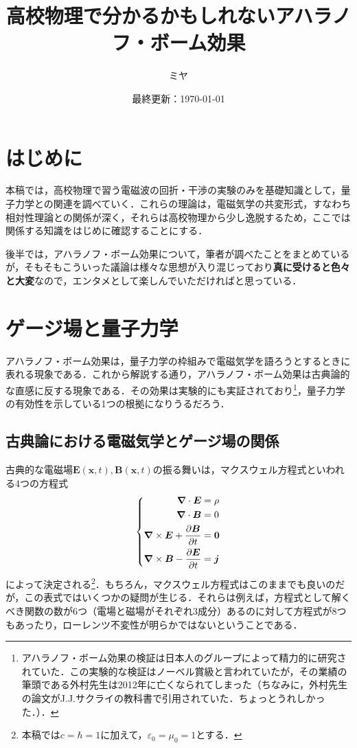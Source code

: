 \documentclass[a4paper,pdflatex,ja=standard]{bxjsarticle}
\title{高校物理で分かるかもしれないアハラノフ・ボーム効果}
\author{ミヤ}
\date{最終更新：\today}
\begin{document}
\maketitle

\tableofcontents

\clearpage
\section{はじめに}

本稿では，高校物理で習う電磁波の回折・干渉の実験のみを基礎知識として，量子力学との関連を調べていく．これらの理論は，電磁気学の共変形式，すなわち相対性理論との関係が深く，それらは高校物理から少し逸脱するため，ここでは関係する知識をはじめに確認することにする．

後半では，アハラノフ・ボーム効果について，筆者が調べたことをまとめているが，そもそもこういった議論は様々な思想が入り混じっており\textbf{真に受けると色々と大変}なので，エンタメとして楽しんでいただければと思っている．


\section{ゲージ場と量子力学}

アハラノフ・ボーム効果は，量子力学の枠組みで電磁気学を語ろうとするときに表れる現象である．これから解説する通り，アハラノフ・ボーム効果は古典論的な直感に反する現象である．その効果は実験的にも実証されており\footnote{
  アハラノフ・ボーム効果の検証は日本人のグループによって精力的に研究されていた．この実験的な検証はノーベル賞級と言われていたが，その業績の筆頭である外村先生は2012年に亡くなられてしまった（ちなみに，外村先生の論文\cite{Tonomura_ObservationAharonovBohm_1982}がJ.J.サクライの教科書\cite{J.J.Sakurai_ModernQuantum_1985}で引用されていた．ちょっとうれしかった．）．
}，量子力学の有効性を示している1つの根拠になりうるだろう．

\subsection{古典論における電磁気学とゲージ場の関係}

古典的な電磁場$\bm{E}(\bm{x},t),\bm{B}(\bm{x},t)$の振る舞いは，マクスウェル方程式といわれる4つの方程式
\begin{equation}
  \left\{
    \begin{alignedat}{1}
      \bm{\nabla}\cdot\bm{E}
      &=
      \rho
      \\
      \bm{\nabla}\cdot\bm{B}
      &=
      0
      \\
      \bm{\nabla}\times\bm{E}+\pdv{\bm{B}}{t}
      &=
      \bm{0}
      \\
      \bm{\nabla}\times\bm{B}
      -
      \pdv{\bm{E}}{t}
      &=
      \bm{j}
    \end{alignedat}
  \right.
  \label{maxwell_eq}
\end{equation}
によって決定される\footnote{
  本稿では$c=\hbar=1$に加えて，$\varepsilon_0=\mu_0=1$とする．
}．もちろん，マクスウェル方程式はこのままでも良いのだが，この表式ではいくつかの疑問が生じる．それらは例えば，方程式として解くべき関数の数が6つ（電場と磁場がそれぞれ3成分）あるのに対して方程式が8つもあったり，ローレンツ不変性が明らかではないということである．
\end{document}
